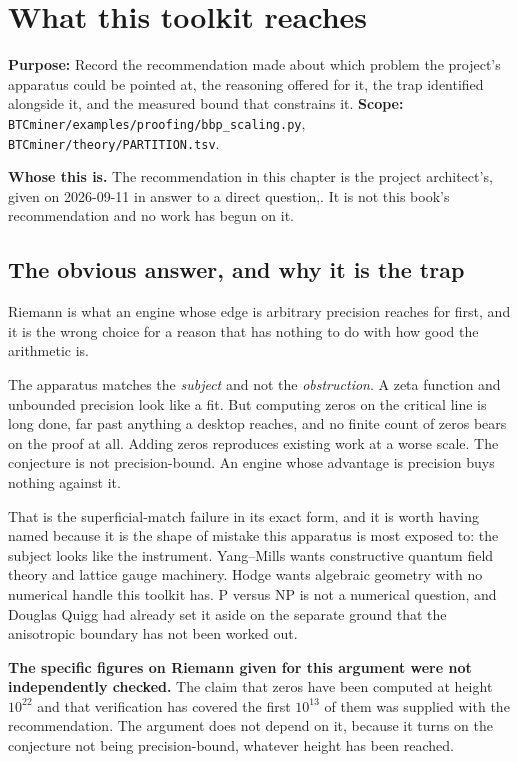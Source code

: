 \chapter{What this toolkit reaches}

\textbf{Purpose:} Record the recommendation made about which problem the project's apparatus could
be pointed at, the reasoning offered for it, the trap identified alongside it, and the measured
bound that constrains it. \textbf{Scope:}
\texttt{BTCminer/\allowbreak{}examples/\allowbreak{}proofing/\allowbreak{}bbp\_\allowbreak{}scaling.\allowbreak{}py},
\texttt{BTCminer/\allowbreak{}theory/\allowbreak{}PARTITION.\allowbreak{}tsv}.

\textbf{Whose this is.} The recommendation in this chapter is the project architect's, given on
2026-09-11 in answer to a direct question,. It is not
this book's recommendation and no work has begun on it.

\section{The obvious answer, and why it is the trap}

Riemann is what an engine whose edge is arbitrary precision reaches for first, and it is the wrong
choice for a reason that has nothing to do with how good the arithmetic is.

The apparatus matches the \emph{subject} and not the \emph{obstruction}. A zeta function and
unbounded precision look like a fit. But computing zeros on the critical line is long done, far past
anything a desktop reaches, and no finite count of zeros bears on the proof at all. Adding zeros
reproduces existing work at a worse scale. The conjecture is not precision-bound. An engine
whose advantage is precision buys nothing against it.

That is the superficial-match failure in its exact form, and it is worth having named because it is
the shape of mistake this apparatus is most exposed to: the subject looks like the instrument.
Yang--Mills wants constructive quantum field theory and lattice gauge machinery. Hodge wants
algebraic geometry with no numerical handle this toolkit has. P versus NP is not a numerical
question, and Douglas Quigg had already set it aside on the separate ground that the anisotropic
boundary has not been worked out.

\textbf{The specific figures on Riemann given for this argument were not independently checked.}
The claim that zeros have been computed at height $10^{22}$ and that verification has covered the
first $10^{13}$ of them was supplied with the recommendation. The
argument does not depend on it, because it turns on the conjecture not being precision-bound,
whatever height has been reached.

